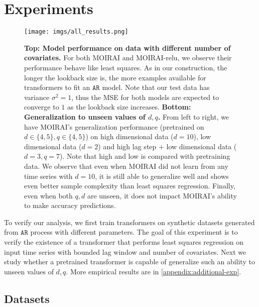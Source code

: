 \vspace{-1em}
\section{Experiments}
\begin{figure*}[t]
    \centering
    \texttt{[image: imgs/all\_results.png]}
    \caption{
    \textbf{Top: Model performance on data with different number of covariates.
    }
    For both MOIRAI and MOIRAI-relu, we observe their performance behave like least squares.
    As in our construction, the longer the lookback size is, the more examples available for transformers to fit an $\mathtt{AR}$ model.
    Note that our test data has variance $\sigma^2 = 1$, thus the MSE for both models are expected to converge to $1$ as the lookback size increases.
    \textbf{Bottom: Generalization to unseen values of $d, q$.}
    From left to right, we have MOIRAI's generalization performance (pretrained on $d\in\{4,5\}, q\in\{4,5\}$) on high dimensional data ($d=10$), low dimensional data ($d=2$) and high lag step + low dimensional data ($d=3,q=7$).
    Note that high and low is compared with pretraining data.
    We observe that even when MOIRAI did not learn from any time series with $d=10$, it is still able to generalize well and shows even better sample complexity than least squares regression.
    Finally, even when both $q,d$ are unseen, it does not impact MOIRAI's ability to make accuracy predictions.
    }
    \label{fig:icl-results}
\end{figure*}

To verify our analysis, we first train transformers on synthetic datasets generated from $\mathtt{AR}$ process with different parameters.
The goal of this experiment is to verify the existence of a transformer that performs least squares regression on input time series with bounded lag window and number of covariates.
Next we study whether a pretrained transformer is capable of generalize such an ability to unseen values of $d, q$.
More empirical results are in \cref{appendix:additional-exp}.
\subsection{Datasets}

